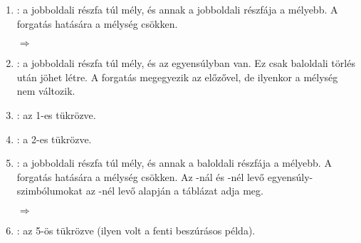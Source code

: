 \begin{enumerate}
\item \pr{>/>}: a jobboldali részfa túl mély, és
  annak a jobboldali részfája a mélyebb. A forgatás
  hatására a mélység csökken.
\begin{center}
\begin{minipage}[b][2.5cm][t]{.3\textwidth}
\end{minipage}
\parbox[b][3cm][c]{2.5em}{\center$\Longrightarrow$}
\begin{minipage}[b][2.5cm][t]{.3\textwidth}
\end{minipage}
\end{center}
\item \pr{>/-}: a jobboldali részfa túl mély, és az
  egyensúlyban van. Ez csak baloldali törlés után
  jöhet létre. A forgatás megegyezik az előzővel, de
  ilyenkor a mélység nem változik.
\item \pr{</<}: az 1-es tükrözve.
\item \pr{</-}: a 2-es tükrözve.
\item \pr{>/<}: a jobboldali részfa túl mély, és
  annak a baloldali részfája a mélyebb. A forgatás
  hatására a mélység csökken. Az -nál és
  -nél levő egyensúly-szimbólumokat az
  -nél levő alapján a  táblázat
  adja meg.
\begin{center}
\begin{minipage}[b][3.5cm][t]{.25\textwidth}
\end{minipage}
\parbox[b][3cm][c]{3.5em}{\center$\Longrightarrow$}
\begin{minipage}[b][3.5cm][t]{.45\textwidth}
\end{minipage}
\end{center}
\item \pr{</>}: az 5-ös tükrözve (ilyen volt a fenti
  beszúrásos példa).
\end{enumerate}


